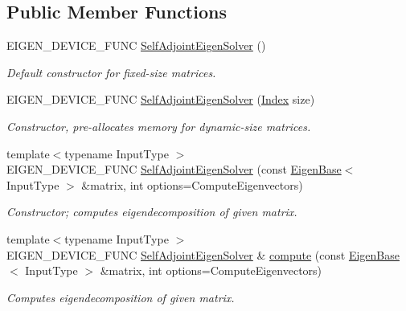 \subsection*{Public Member Functions}
\begin{DoxyCompactItemize}
\item 
E\+I\+G\+E\+N\+\_\+\+D\+E\+V\+I\+C\+E\+\_\+\+F\+U\+NC \mbox{\hyperlink{class_eigen_1_1_self_adjoint_eigen_solver_af3466b3809be4a7738d84493d80d4737}{Self\+Adjoint\+Eigen\+Solver}} ()
\begin{DoxyCompactList}\small\item\em Default constructor for fixed-\/size matrices. \end{DoxyCompactList}\item 
E\+I\+G\+E\+N\+\_\+\+D\+E\+V\+I\+C\+E\+\_\+\+F\+U\+NC \mbox{\hyperlink{class_eigen_1_1_self_adjoint_eigen_solver_af20f466a4c29477271e91841e3382b27}{Self\+Adjoint\+Eigen\+Solver}} (\mbox{\hyperlink{class_eigen_1_1_self_adjoint_eigen_solver_a8a59ab7734b6eae2754fd78bc7c3a360}{Index}} size)
\begin{DoxyCompactList}\small\item\em Constructor, pre-\/allocates memory for dynamic-\/size matrices. \end{DoxyCompactList}\item 
{\footnotesize template$<$typename Input\+Type $>$ }\\E\+I\+G\+E\+N\+\_\+\+D\+E\+V\+I\+C\+E\+\_\+\+F\+U\+NC \mbox{\hyperlink{class_eigen_1_1_self_adjoint_eigen_solver_ade694ed7b0a4d9da9480cedc849be76f}{Self\+Adjoint\+Eigen\+Solver}} (const \mbox{\hyperlink{struct_eigen_1_1_eigen_base}{Eigen\+Base}}$<$ Input\+Type $>$ \&matrix, int options=Compute\+Eigenvectors)
\begin{DoxyCompactList}\small\item\em Constructor; computes eigendecomposition of given matrix. \end{DoxyCompactList}\item 
{\footnotesize template$<$typename Input\+Type $>$ }\\E\+I\+G\+E\+N\+\_\+\+D\+E\+V\+I\+C\+E\+\_\+\+F\+U\+NC \mbox{\hyperlink{class_eigen_1_1_self_adjoint_eigen_solver}{Self\+Adjoint\+Eigen\+Solver}} \& \mbox{\hyperlink{class_eigen_1_1_self_adjoint_eigen_solver_a88bcdc24112efa7c4d2ebb3476efcbe9}{compute}} (const \mbox{\hyperlink{struct_eigen_1_1_eigen_base}{Eigen\+Base}}$<$ Input\+Type $>$ \&matrix, int options=Compute\+Eigenvectors)
\begin{DoxyCompactList}\small\item\em Computes eigendecomposition of given matrix. \end{DoxyCompactList}\item 

\end{DoxyCompactItemize}

